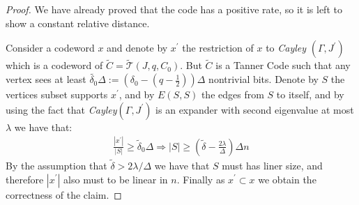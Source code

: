 \begin{proof} We have already proved that the code has a positive rate, so it is left to show a constant relative distance.

  Consider a codeword $x$ and denote by $x^{\prime}$ the restriction of $x$ to \emph{Cayley }$\left( \Gamma, J^{\prime}  \right)$ which is a codeword of $\tilde{C} = \tilde{\mathcal{T}}\left(J, q ,C_{0}\right)$. But $\tilde{C}$ is a Tanner Code such that any vertex sees at least $ \tilde{\delta_{0}} \Delta := \left(\delta_{0} - \left( q - \frac{1}{2}   \right) \right)\Delta $ nontrivial bits.
  Denote by $S$ the vertices subset supports $x^{\prime}$, and by $E\left( S,S \right)$ the edges from $S$ to itself, and by using the fact that \emph{Cayley}$\left( \Gamma, J^{\prime} \right)$ is an expander with second eigenvalue at most $\lambda$ we have that: 
  \begin{equation*}
    \begin{split}
      \frac{|x^{\prime}|}{|S|} \ge \tilde{\delta}_{0}\Delta \Rightarrow  |S| \ge \left( \tilde{\delta} - \frac{2\lambda}{\Delta}  \right)\Delta n 
    \end{split}
  \end{equation*}
  By the assumption that $\tilde{\delta} > 2\lambda / \Delta $ we have that $S$ must has liner size, and therefore $|x^{\prime}|$ also must to be linear in $n$. Finally as $x^{\prime} \subset x$ we obtain the correctness of the claim.  
\end{proof} 

